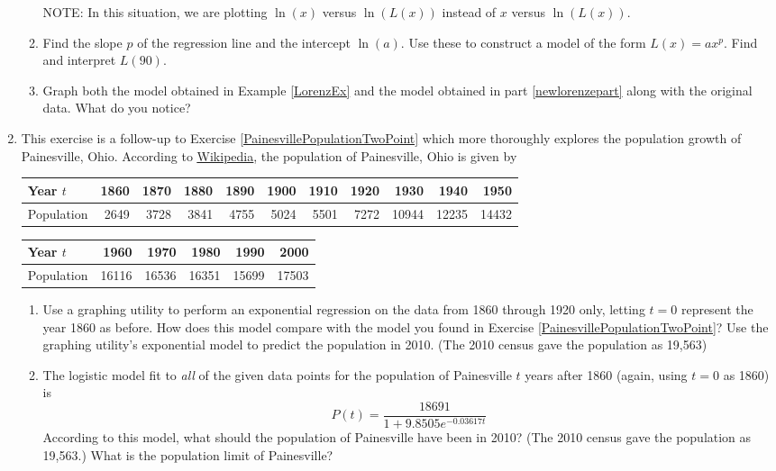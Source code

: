 \documentclass{ximera}
\begin{document}
\begin{enumerate}
\begin{enumerate}
NOTE:  In this situation, we are plotting $\ln(x)$ versus $\ln(L(x))$ instead of $x$ versus $\ln(L(x))$.  

\item  \label{newlorenzepart} Find the slope $p$ of the regression line and the intercept $\ln(a)$.  Use these to construct a model of the form $L(x) = a x^{p}$.   Find and interpret $L(90)$.

\item   Graph both the model obtained in Example \ref{LorenzEx} and the model obtained in part \ref{newlorenzepart} along with the original data.  What do you notice?

\end{enumerate}

\item  \label{PainesvillePopulationManyPoints} This exercise is a follow-up to Exercise \ref{PainesvillePopulationTwoPoint} which more thoroughly explores the population growth of Painesville, Ohio.  According to \href{http://en.wikipedia.org/wiki/Painesville}{\underline{Wikipedia}}, the population of Painesville, Ohio is given by


\noindent \begin{tabular}{|l|r|r|r|r|r|r|r|r|r|r|} \hline
Year $t$ & 1860 & 1870 & 1880 & 1890 & 1900 & 1910 & 1920 & 1930 & 1940 & 1950 \\ \hline 
Population& 2649 & 3728 & 3841 & 4755 & 5024 & 5501 & 7272 & 10944 & 12235 & 14432 \\ \hline
\end{tabular}

\noindent \begin{tabular}{|l|r|r|r|r|r|} \hline
Year $t$ & 1960 & 1970 & 1980 & 1990 & 2000 \\ \hline 
Population& 16116 & 16536 & 16351 & 15699 & 17503 \\ \hline
\end{tabular}

\begin{enumerate}

\item  Use a graphing utility to perform an exponential regression on the data from 1860 through 1920 only, letting $t = 0$ represent the year 1860 as before.  How does this model compare with the model you found in Exercise \ref{PainesvillePopulationTwoPoint}?   Use the graphing utility's exponential model to predict the population in 2010.   (The 2010 census gave the population as 19,563)

\item  The logistic model fit to \emph{all} of the given data points for the population of Painesville $t$ years after 1860 (again, using $t = 0$ as 1860) is \[ P(t) = \dfrac{18691}{1+9.8505e^{-0.03617t}} \] According to this model, what should the population of Painesville have been in 2010?  (The 2010 census gave the population as 19,563.) What is the population limit of Painesville?


\end{enumerate}
\end{enumerate}
\end{document}

